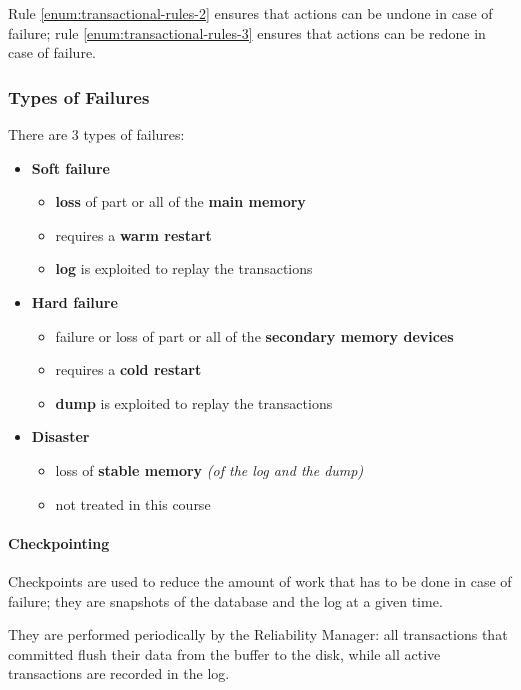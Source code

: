 \documentclass[english]{article}
\begin{document}
Rule \ref{enum:transactional-rules-2} ensures that actions can be undone in case of failure;
rule \ref{enum:transactional-rules-3} ensures that actions can be redone in case of failure.

\subsubsection{Types of Failures}

There are \(3\) types of failures:

\begin{itemize}
  \item \textbf{Soft failure}
        \begin{itemize}
          \item \textbf{loss} of part or all of the \textbf{main memory}
          \item requires a \textbf{warm restart}
          \item \textbf{log} is exploited to replay the transactions
        \end{itemize}
  \item \textbf{Hard failure}
        \begin{itemize}
          \item failure or loss of part or all of the \textbf{secondary memory devices}
          \item requires a \textbf{cold restart}
          \item \textbf{dump} is exploited to replay the transactions
        \end{itemize}
  \item \textbf{Disaster}
        \begin{itemize}
          \item loss of \textbf{stable memory} \textit{(of the log and the dump)}
          \item not treated in this course
        \end{itemize}
\end{itemize}

\paragraph{Checkpointing}

Checkpoints are used to reduce the amount of work that has to be done in case of failure;
they are snapshots of the database and the log at a given time.

They are performed periodically by the Reliability Manager:
all transactions that committed flush their data from the buffer to the disk, while all active transactions are recorded in the log.
\end{document}
